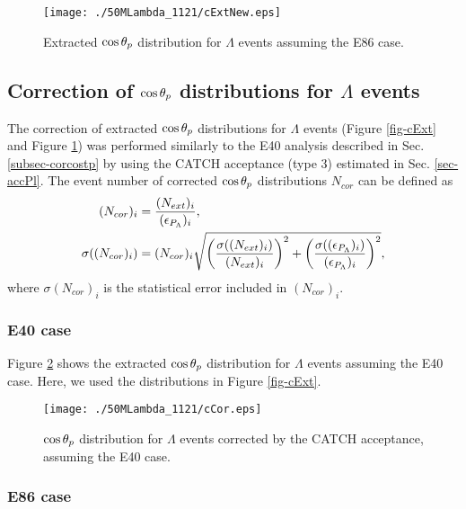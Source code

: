 \begin{figure}[h]
  \centering
  \texttt{[image: ./50MLambda\_1121/cExtNew.eps]}
  \caption{Extracted $\cos{\theta_p}$ distribution for $\Lambda$ events assuming the E86 case.}
  \label{fig-cExtNew}
\end{figure}


\clearpage
\subsection{Correction of $\cos{\theta_p}$ distributions for $\Lambda$ events}
\label{subsec-randext}

The correction of extracted $\cos{\theta_p}$ distributions for $\Lambda$ events (Figure \ref{fig-cExt} and Figure \ref{fig-cExtNew}) was performed similarly to the E40 analysis described in Sec. \ref{subsec-corcostp} by using the CATCH acceptance (type 3) estimated in Sec. \ref{sec-accPl}. The event number of corrected $\cos{\theta_p}$ distributions $N_{cor}$ can be defined as 
\begin{align}
  (N_{cor})_i &= \frac{(N_{ext})_i}{(\epsilon_{P_{\Lambda}})_i}, \\
  \sigma((N_{cor})_i) &= (N_{cor})_i \sqrt{\left( \frac{\sigma((N_{ext})_i)}{(N_{ext})_i} \right)^2 +\left( \frac{\sigma((\epsilon_{P_{\Lambda}})_i)}{(\epsilon_{P_{\Lambda}})_i} \right)^2},
\end{align}
where $\sigma(N_{cor})_i$ is the statistical error included in $(N_{cor})_i$.


\subsubsection{E40 case}
\label{subsubsec-randcore40}

Figure \ref{fig-cCor} shows the extracted $\cos{\theta_p}$ distribution for $\Lambda$ events assuming the E40 case. Here, we used the distributions in Figure \ref{fig-cExt}. 

\begin{figure}[h]
  \centering
  \texttt{[image: ./50MLambda\_1121/cCor.eps]}
  \caption{$\cos{\theta_p}$ distribution for $\Lambda$ events corrected by the CATCH acceptance, assuming the E40 case.}
  \label{fig-cCor}
\end{figure}

\subsubsection{E86 case}
\label{subsubsec-randcore86}

